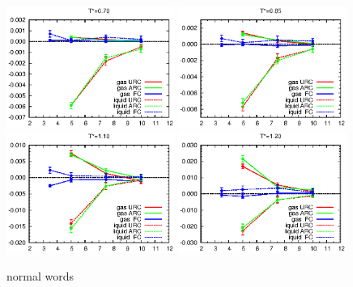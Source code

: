 \documentclass[aps,pre,preprint]{revtex4}
\begin{document}
\begin{figure}
  \centering
  \includegraphics[width=0.49\textwidth]{fig/converge/t0.70.eps} 
  \includegraphics[width=0.49\textwidth]{fig/converge/t0.85.eps} 
  \includegraphics[width=0.49\textwidth]{fig/converge/t1.10.eps} 
  \includegraphics[width=0.49\textwidth]{fig/converge/t1.20.eps} 
  \caption{normal words}
  \label{fig:tmp5}
\end{figure}
\end{document}
